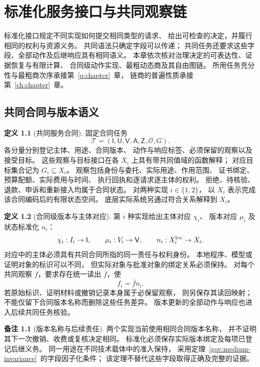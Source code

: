 \documentclass[UTF8,12pt,a4paper,openany,fontset=none,zihao=false]{ctexrep}
\theoremstyle{definition}
\newtheorem{definition}{定义}[chapter]
\newtheorem{remark}{备注}[chapter]
\newcommand{\1}{\mathbf 1}
\begin{document}
\chapter{标准化服务接口与共同观察链}
\label{integrated:standard-service}
\label{std:chapter}

标准化接口规定不同实现如何提交相同类型的请求、
给出可检查的决定，并履行相同的权利与资源义务。
共同语法只确定字段可以传递；
共同任务还要求这些字段、全部动作及后继响应具有相同语义。
本章依次核对治理决定的可表达性、证据恢复与有限计算、
合同级动作实现、最粗动态商及其自由图链。
所用任务充分性与最粗商次序承接第~\ref{q:chapter}~章，
链商的普遍性质承接第~\ref{ch:chapter}~章\cite{InternalTheory}。

\section{共同合同与版本语义}

\begin{definition}[共同服务合同]
\label{std:contract}
固定合同任务
\[
\mathcal T=(\mathsf I,\mathsf U,\mathsf V,
\mathsf A,\mathsf Z,\mathcal O,G).
\]
各分量分别登记主体、用途、合同版本、
动作与响应标签、必须保留的观察以及接受目标。
这些观察与目标接口在各 \(X_i\) 上具有带共同值域的函数解释；
对应目标集合记为 \(G_i\subseteq X_i\)。
观察包括身份与委托、实际用途、作用范围、
证书绑定、预算配额、实际费用与时间、
执行回执和逐请求逐主体的权利。
拒绝、待核验、退款、申诉和重新接入均属于合同状态。
对两种实现 \(i\in\{1,2\}\)，
以 \(X_i\) 表示完成该合同编码后的有限状态空间。
底层实际系统另通过符合关系解释到 \(X_i\)。
\end{definition}

\begin{definition}[合同级版本与主体对应]
\label{std:normalization}
第 \(i\) 种实现给出主体对应 \(\chi_i\)、
版本对应 \(\mu_i\) 及状态标准化 \(n_i\)：
\[
\chi_i:I_i\to\mathsf I,\qquad
\mu_i:V_i\to\mathsf V,\qquad
n_i:X_i^{\rm loc}\to X_i.
\]
对应中的主体必须具有共同合同所指的同一责任与权利身份。
本地程序、模型或证明对象的标识可以不同，
但实际对象与批准对象的绑定关系必须保持。
对每个共同观察 \(f\)，要求存在统一读出 \(\bar f\)，使
\[
f_i=\bar f n_i.
\]
若原始标识、证明材料或撤销记录本身属于必保留观察，
则另保存其读回映射；
不能仅留下合同版本名称而删除这些任务差异。
版本更新的全部动作与响应也进入后续共同任务核验。
\end{definition}

\begin{remark}[版本名称与后续责任]
两个实现当前使用相同合同版本名称，
并不证明其下一次撤销、收费或复核决定相同。
标准化必须保存实际版本绑定及每项已登记后继义务。
同一用途在不同技术载体中的准入保持，
采用定理~\ref{gov:medium-invariance}~的字段因子化条件；
该定理不替代这些字段取得正确及完整的证据。
\end{remark}
\end{document}
